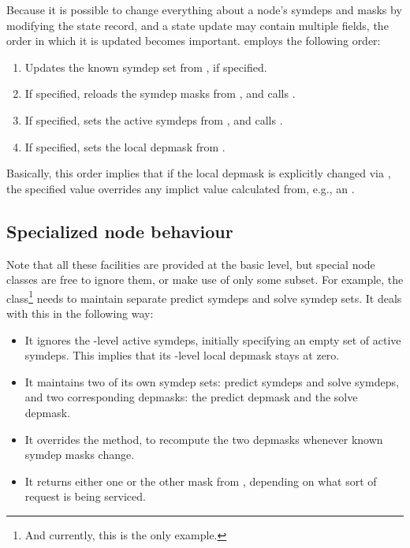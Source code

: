   Because it is possible to change everything about a node's symdeps and masks
  by modifying the state record, and a state update may contain multiple
  fields, the order in which it is updated becomes important.
   employs the following order:

  \begin{enumerate}
  
  \item Updates the known symdep set from , if specified.
  
  \item If specified, reloads the symdep masks from , and
    calls .
    
  \item If specified, sets the active symdeps from , and
    calls .
    
  \item If specified, sets the local depmask from .
  
  \end{enumerate}
  
  Basically, this order implies that if the local depmask is explicitly changed
  via , the specified value overrides any implict value
  calculated from, e.g., an .
  
\subsection{Specialized node behaviour}  
  
  Note that all these facilities are provided at the basic  level, but
  special node classes are free to ignore them, or make use of only some
  subset. For example, the  class\footnote{And currently, this is the
  only example.} needs to maintain separate predict symdeps and solve symdep
  sets. It deals with this in the following way:

  \begin{itemize}
  
  \item It ignores the -level active symdeps, initially specifying an
    empty set of active symdeps. This implies that its -level local
    depmask stays at zero.

  \item It maintains two of its own symdep sets: predict symdeps and solve
    symdeps, and two corresponding depmasks: the predict depmask and the solve
    depmask.
    
  \item It overrides the  method, to recompute the two
    depmasks whenever known symdep masks change.
    
  \item It returns either one or the other mask from , depending
    on what sort of request is being serviced.

  \end{itemize}
  
